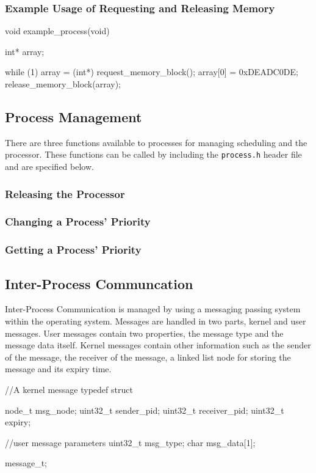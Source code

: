 \documentclass[se]{uw-wkrpt}
\begin{document}
\subsubsection{Example Usage of Requesting and Releasing Memory}
\begin{code}
void example_process(void) {
    int* array;
    
    while (1) {
        array = (int*) request_memory_block();
        array[0] = 0xDEADC0DE;
        release_memory_block(array);
    }
}
\end{code}

\subsection{Process Management}

There are three functions available to processes for managing scheduling and the processor. These functions can be called by including the \texttt{process.h} header file and are specified below.

\subsubsection{Releasing the Processor}

\subsubsection{Changing a Process' Priority}

\subsubsection{Getting a Process' Priority}

\subsection{Inter-Process Communcation} \label{sec:ipc}

Inter-Process Communication is managed by using a messaging passing system within the operating system. Messages are handled in two parts, kernel and user messages. User messages contain two properties, the message type and the message data itself. Kernel messages contain other information such as the sender of the message, the receiver of the message, a linked list node for storing the message and its expiry time.

\begin{code}
//A kernel message
typedef struct {
    node_t msg_node;
    uint32_t sender_pid;
    uint32_t receiver_pid;
    uint32_t expiry;
    
    //user message parameters
    uint32_t msg_type;
    char msg_data[1];
} message_t;
\end{code}
\end{document}
